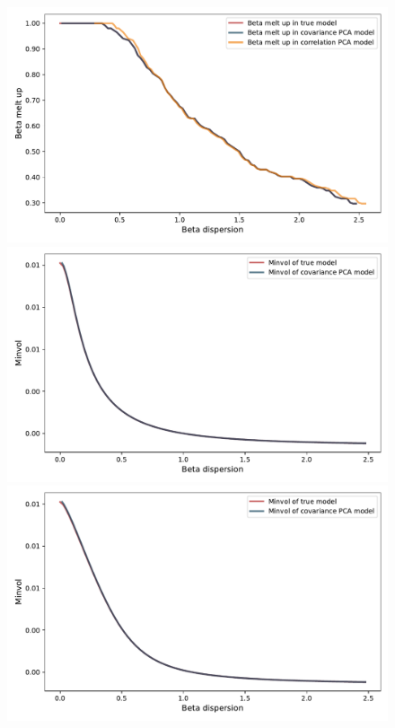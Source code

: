 \documentclass[leqno,12pt]{article}
\begin{document}
{\begin{figure}[htp]
\begin{center}
  \includegraphics[scale=0.33]{img/DispersionvsMeltup1factorsN512T256fvol16minsvol30maxsvol90}
  \includegraphics[scale=0.33]{img/DispersionvsPortfolioLSMinvol1factorsN512T256fvol16minsvol30maxsvol90}
  \includegraphics[scale=0.33]{img/DispersionvsPortfolioLOMinvol1factorsN512T256fvol16minsvol30maxsvol90}

\end{center}
\end{figure}}
\end{document}
